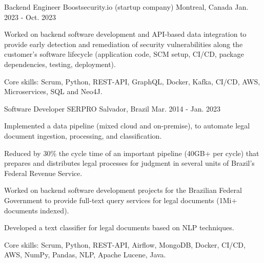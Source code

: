 


\begin{cventries}


\cventry
{Backend Engineer} %
{Boostsecurity.io (startup company)} %
{Montreal, Canada} %
{Jan. 2023 - Oct. 2023} %
{ %
\begin{cvitems}
	\item {Worked on backend software development and API-based data integration to provide early detection and remediation of security vulnerabilities along the customer's software lifecycle (application code, SCM setup, CI/CD, package dependencies, testing, deployment).}
	\item{Core skills: Scrum, Python, REST-API, GraphQL, Docker, Kafka, CI/CD, AWS, Microservices, SQL and Neo4J.}
\end{cvitems}
}


\cventry
{Software Developer} %
{SERPRO} %
{Salvador, Brazil} %
{Mar. 2014 - Jan. 2023} %
{ %
\begin{cvitems}
	\item{Implemented a data pipeline (mixed cloud and on-premise), to automate legal document ingestion, processing, and classification.}
	\item{Reduced by 30\% the cycle time of an important pipeline (40GB+ per cycle) that prepares and distributes legal processes for judgment in several units of Brazil’s Federal Revenue Service.}
	\item{Worked on backend software development projects for the Brazilian Federal Government to provide full-text query services for legal documents (1Mi+ documents indexed).}
	\item{Developed a text classifier for legal documents based on NLP techniques.}
	\item{Core skills: Scrum, Python, REST-API, Airflow, MongoDB, Docker, CI/CD, AWS, NumPy, Pandas, NLP, Apache Lucene, Java.}
\end{cvitems}
}


\end{cventries}

